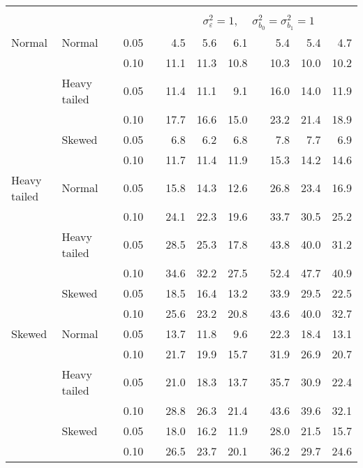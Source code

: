 \begin{table}[ht]
\begin{scriptsize}
\begin{center}
\begin{tabular}{ll p{.1cm} c p{.1cm} rrr p{.1cm} rrr}
&&&&&&&&&&&\\
& && && \multicolumn{7}{c}{$\sigma_{\varepsilon}^2 = 1$, \ \ $\sigma_{b_0}^2 = \sigma_{b_1}^2 = 1$} \\ \cline{6-12}
Normal       & Normal       && 0.05 &&   4.5 & 5.6 & 6.1 &   & 5.4 & 5.4 & 4.7 \\ 
             &              && 0.10 &&   11.1 & 11.3 & 10.8 &   & 10.3 & 10.0 & 10.2 \\ 
             & Heavy tailed && 0.05 &&   11.4 & 11.1 & 9.1 &   & 16.0 & 14.0 & 11.9 \\ 
             &              && 0.10 &&   17.7 & 16.6 & 15.0 &   & 23.2 & 21.4 & 18.9 \\ 
             & Skewed       && 0.05 &&   6.8 & 6.2 & 6.8 &   & 7.8 & 7.7 & 6.9 \\ 
             &              && 0.10 &&   11.7 & 11.4 & 11.9 &   & 15.3 & 14.2 & 14.6 \\ 
Heavy tailed & Normal       && 0.05 &&   15.8 & 14.3 & 12.6 &   & 26.8 & 23.4 & 16.9 \\ 
             &              && 0.10 &&   24.1 & 22.3 & 19.6 &   & 33.7 & 30.5 & 25.2 \\ 
             & Heavy tailed && 0.05 &&   28.5 & 25.3 & 17.8 &   & 43.8 & 40.0 & 31.2 \\ 
             &              && 0.10 &&   34.6 & 32.2 & 27.5 &   & 52.4 & 47.7 & 40.9 \\ 
             & Skewed       && 0.05 &&   18.5 & 16.4 & 13.2 &   & 33.9 & 29.5 & 22.5 \\ 
             &              && 0.10 &&   25.6 & 23.2 & 20.8 &   & 43.6 & 40.0 & 32.7 \\ 
Skewed       & Normal       && 0.05 &&   13.7 & 11.8 & 9.6 &   & 22.3 & 18.4 & 13.1 \\ 
             &              && 0.10 &&   21.7 & 19.9 & 15.7 &   & 31.9 & 26.9 & 20.7 \\ 
             & Heavy tailed && 0.05 &&   21.0 & 18.3 & 13.7 &   & 35.7 & 30.9 & 22.4 \\ 
             &              && 0.10 &&   28.8 & 26.3 & 21.4 &   & 43.6 & 39.6 & 32.1 \\ 
             & Skewed       && 0.05 &&   18.0 & 16.2 & 11.9 &   & 28.0 & 21.5 & 15.7 \\ 
             &              && 0.10 &&   26.5 & 23.7 & 20.1 &   & 36.2 & 29.7 & 24.6 \\ 


\end{tabular}
\end{center}
\end{scriptsize}
\end{table}
